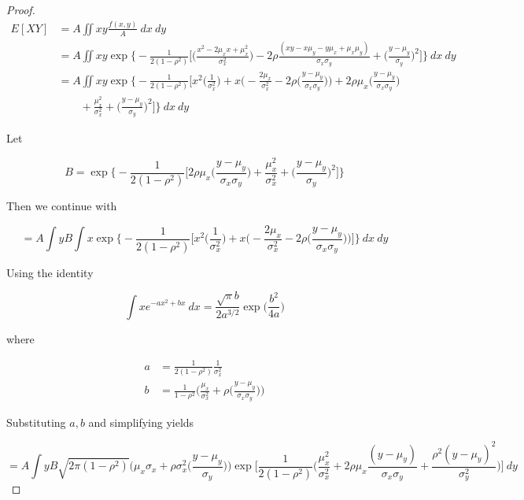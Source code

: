 \documentclass[10pt, oneside]{article}   	%
\theoremstyle{definition}
\begin{document}
\begin{enumerate}[label=9.\arabic*]
\begin{proof}
\begin{align*}
E[XY] &= A \iint xy \frac{f(x,y)}{A} \ dx \ dy \\
&= A \iint xy \exp \bigg\{ -\frac{1}{2(1-\rho^2)} \bigg[ \bigg( \frac{x^2 - 2\mu_x x + \mu^2_x}{\sigma^2_x} \bigg) - 2\rho \frac{(xy - x\mu_y - y\mu_x + \mu_x \mu_y)}{\sigma_x \sigma_y} + \bigg( \frac{y - \mu_y}{\sigma_y} \bigg)^2 \bigg] \bigg\} \ dx \ dy \\
&= A \iint xy \exp \bigg\{ -\frac{1}{2(1-\rho^2)} \bigg[ x^2 \bigg( \frac{1}{\sigma^2_x} \bigg) + x \bigg( -\frac{2\mu_x}{\sigma^2_x} - 2\rho \bigg( \frac{y-\mu_y}{\sigma_x \sigma_y} \bigg) \bigg) + 2\rho \mu_x \bigg( \frac{y-\mu_y}{\sigma_x \sigma_y} \bigg) \\
&\quad \quad + \frac{\mu^2_x}{\sigma^2_x} +\bigg( \frac{y - \mu_y}{\sigma_y} \bigg)^2 \bigg] \bigg\} \ dx \ dy
\end{align*}

Let

\[ B = \exp \bigg\{ -\frac{1}{2(1-\rho^2)} \bigg[ 2\rho \mu_x \bigg( \frac{y-\mu_y}{\sigma_x \sigma_y} \bigg) + \frac{\mu^2_x}{\sigma^2_x} + \bigg( \frac{y - \mu_y}{\sigma_y} \bigg)^2 \bigg] \bigg\} \]

Then we continue with

\[ = A \int yB \int x \exp \bigg\{ -\frac{1}{2(1-\rho^2)} \bigg[ x^2 \bigg( \frac{1}{\sigma^2_x} \bigg) + x \bigg( -\frac{2\mu_x}{\sigma^2_x} - 2\rho \bigg( \frac{y - \mu_y}{\sigma_x \sigma_y} \bigg) \bigg) \bigg] \bigg\} \ dx \ dy \]

Using the identity

\[ \int x e^{-ax^2 + bx} \ dx = \frac{\sqrt{\pi} b}{2a^{3/2}} \exp \bigg( \frac{b^2}{4a} \bigg) \]

where

\begin{align*}
a &= \frac{1}{2(1-\rho^2)} \frac{1}{\sigma^2_x} \\
b &= \frac{1}{1-\rho^2} \bigg( \frac{\mu_x}{\sigma^2_x} + \rho \bigg( \frac{y - \mu_y}{\sigma_x \sigma_y} \bigg) \bigg)
\end{align*}

Substituting $a,b$ and simplifying yields

\[ = A \int y B \sqrt{2 \pi (1-\rho^2)} \bigg( \mu_x \sigma_x + \rho \sigma^2_x \bigg( \frac{y-\mu_y}{\sigma_y} \bigg) \bigg) \exp \bigg[ \frac{1}{2(1-\rho^2)} \bigg( \frac{\mu^2_x}{\sigma^2_x} + 2\rho \mu_x \frac{(y - \mu_y)}{\sigma_x \sigma_y} + \frac{\rho^2 (y-\mu_y)^2}{\sigma^2_y} \bigg) \bigg] \ dy  \]


\end{proof}
\end{enumerate}
\end{document}
